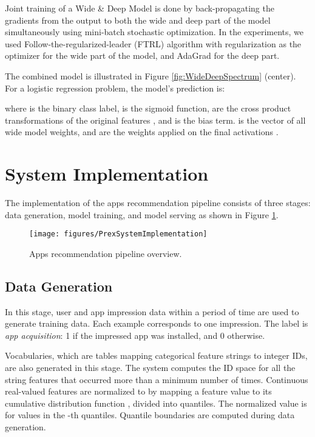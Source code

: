 \documentclass{sig-alternate-05-2015}
\begin{document}
Joint training of a Wide \& Deep Model is done by back-propagating the gradients from the output to both the wide and deep part of the model simultaneously using mini-batch stochastic optimization. In the experiments, we used Follow-the-regularized-leader (FTRL) algorithm \cite{FTRL11} with  regularization as the optimizer for the wide part of the model, and AdaGrad \cite{Adagrad11} for the deep part.

The combined model is illustrated in Figure \ref{fig:WideDeepSpectrum} (center).
For a logistic regression problem, the model's prediction is:

where  is the binary class label,  is the sigmoid function,  are the cross product transformations of the original features , and  is the bias term.  is the vector of all wide model weights, and  are the weights applied on the final activations .

\section{System Implementation}
The implementation of the apps recommendation pipeline consists of three stages: data generation, model training, and model serving as shown in Figure \ref{fig:PrexSystemImplementation}.

\begin{figure}[t!]
	\centering
	\texttt{[image: figures/PrexSystemImplementation]}
	\caption{Apps recommendation pipeline overview.}
	\label{fig:PrexSystemImplementation}
\end{figure}

\subsection{Data Generation}
In this stage, user and app impression data within a period of time are used to generate training data. Each example corresponds to one impression. The label is \textit{app acquisition}: 1 if the impressed app was installed, and 0 otherwise. 

Vocabularies, which are tables mapping categorical feature strings to integer IDs, are also generated in this stage. The system computes the ID space for all the string features that occurred more than a minimum number of times.
Continuous real-valued features are normalized to  by mapping a feature value  to its cumulative distribution function , divided into  quantiles. The normalized value is  for values in the -th quantiles. Quantile boundaries are computed during data generation.
\end{document}
